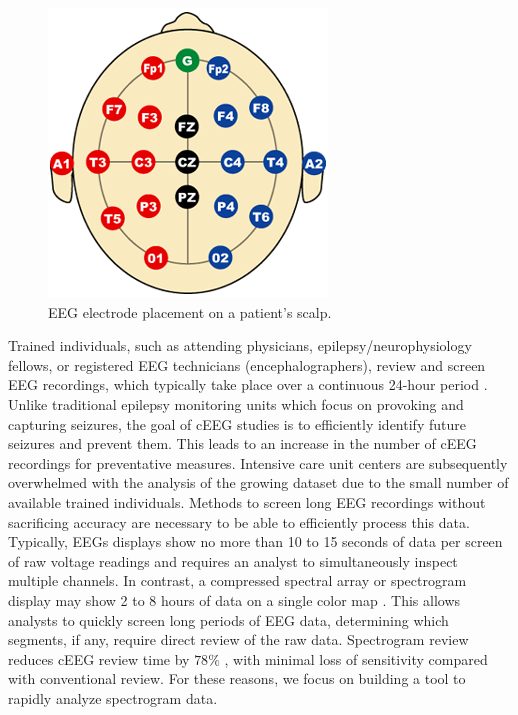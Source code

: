 \begin{figure}[h]
\begin{center}
\includegraphics[scale=0.5]{./img/electrodes.png}
\caption{EEG electrode placement on a patient's scalp.}
\label{fig:electrodes}
\end{center}
\end{figure}

Trained individuals, such as attending physicians, epilepsy/neurophysiology
fellows, or registered EEG technicians (encephalographers), review and screen
EEG recordings, which typically take place over a continuous 24-hour period
\cite{ceeg-3}. Unlike traditional epilepsy monitoring units which focus on
provoking and capturing seizures, the goal of cEEG studies is to efficiently
identify future seizures and prevent them. This leads to an increase in the
number of cEEG recordings for preventative measures. Intensive care unit
centers are subsequently overwhelmed with the analysis of the growing dataset
due to the small number of available trained individuals. Methods to screen
long EEG recordings without sacrificing accuracy are necessary to be able to
efficiently process this data. \\

Typically, EEGs displays show no more than 10 to 15 seconds of data per screen
of raw voltage readings and requires an analyst to simultaneously inspect
multiple channels. In contrast, a compressed spectral array \cite{csa} or
spectrogram display may show 2 to 8 hours of data on a single color map
\cite{ceeg-3}. This allows analysts to quickly screen long periods of EEG data,
determining which segments, if any, require direct review of the raw data.
Spectrogram review reduces cEEG review time by $78\%$ \cite{ceeg-2}, with
minimal loss of sensitivity compared with conventional review. For these
reasons, we focus on building a tool to rapidly analyze spectrogram data. \\

